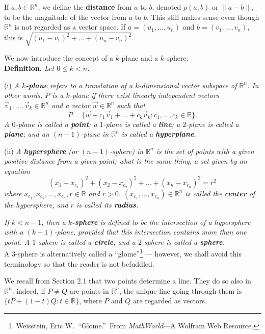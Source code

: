 \documentclass[leqno]{book}
\begin{document}
If $a,b\in\mathbb R^n$, we define the \textbf{distance} from $a$ to $b$, denoted $\rho(a,b)$ or $\|a-b\|$, to be the magnitude of the vector from $a$ to $b$.  This still makes sense even though $\mathbb R^n$ is not regarded as a vector space.  If $a=(u_1,\dots,u_n)$ and $b=(v_1,\dots,v_n)$, this is $\sqrt{(u_1-v_1)^2+\dots+(u_n-v_n)^2}$.

We now introduce the concept of a $k$-plane and a $k$-sphere:\\

\noindent\textbf{Definition.} \emph{Let $0\leqslant k<n$.}

(i) \emph{A \textbf{$k$-plane} refers to a translation of a $k$-dimensional vector subspace of $\mathbb R^n$.  In other words, $P$ is a $k$-plane if there exist linearly independent vectors $\vec v_1,\dots,\vec v_k\in\mathbb R^n$ and a vector $\vec w\in\mathbb R^n$ such that}
$$P=\{\vec w+c_1\vec v_1+\dots+c_k\vec v_k:c_1,\dots,c_k\in\mathbb R\}.$$
\emph{A $0$-plane is called a \textbf{point}; a $1$-plane is called a \textbf{line}; a $2$-plane is called a \textbf{plane}; and an $(n-1)$-plane in $\mathbb R^n$ is called a \textbf{hyperplane}.}

(ii) \emph{A \textbf{hypersphere} (or $(n-1)$-sphere) in $\mathbb R^n$ is the set of points with a given positive distance from a given point; what is the same thing, a set given by an equation}
$$(x_1-x_{c_1})^2+(x_2-x_{c_2})^2+\dots+(x_n-x_{c_n})^2=r^2$$
\emph{where $x_{c_1},x_{c_2},\dots,x_{c_n},r\in\mathbb R$ and $r>0$.  $(x_{c_1},\dots,x_{c_n})\in\mathbb R^n$ is called the \textbf{center} of the hypersphere, and $r$ is called its \textbf{radius}.}

\emph{If $k<n-1$, then a \textbf{$k$-sphere} is defined to be the intersection of a hypersphere with a $(k+1)$-plane, provided that this intersection contains more than one point.  A $1$-sphere is called a \textbf{circle}, and a $2$-sphere is called a \textbf{sphere}.}\\

\noindent A $3$-sphere is alternatively called a ``glome''\footnote{Weisstein, Eric W.~``Glome.''~From \emph{MathWorld}\----A Wolfram Web Resource.} %
\---- however, we shall avoid this terminology so that the reader is not befuddled.

We recall from Section 2.1 that two points determine a line.  They do so also in $\mathbb R^n$: indeed, if $P\ne Q$ are points in $\mathbb R^n$, the unique line going through them is $\{tP+(1-t)Q:t\in\mathbb R\}$, where $P$ and $Q$ are regarded as vectors.
\end{document}
